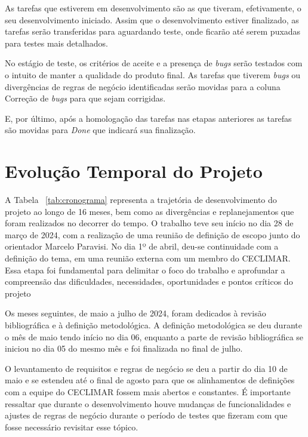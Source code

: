 As tarefas que estiverem em desenvolvimento são as que tiveram, efetivamente, o seu 
desenvolvimento iniciado. Assim que o desenvolvimento estiver finalizado, as tarefas 
serão transferidas para aguardando teste, onde ficarão até serem puxadas para testes 
mais detalhados.

No estágio de teste, os critérios de aceite e a presença de \textit{bugs} serão 
testados com o intuito de manter a qualidade do produto final. As tarefas que tiverem 
\textit{bugs} ou divergências de regras de negócio identificadas serão movidas para a coluna 
Correção de \textit{bugs} para que sejam corrigidas.

E, por último, após a homologação das tarefas nas etapas anteriores as tarefas 
são movidas para \textit{Done} que indicará sua finalização.

\section{Evolução Temporal do Projeto}\label{cronograma}
A Tabela ~\ref{tab:cronograma} representa a trajetória de 
desenvolvimento do projeto ao longo de 16 meses, bem como as divergências e 
replanejamentos que foram realizados no decorrer do tempo. O trabalho teve seu 
início no dia 28 de março de 2024, com a realização de uma reunião de definição 
de escopo junto do orientador Marcelo Paravisi. No dia 1º de abril, deu-se 
continuidade com a definição do tema, em uma reunião externa com um membro do 
CECLIMAR. Essa etapa foi fundamental para delimitar o foco do trabalho e aprofundar 
a compreensão das dificuldades, necessidades, oportunidades e pontos críticos do projeto

Os meses seguintes, de maio a julho de 2024, foram dedicados à revisão bibliográfica 
e à definição metodológica. A definição metodológica se deu durante o mês de maio 
tendo início no dia 06, enquanto a parte de revisão bibliográfica se iniciou no 
dia 05 do mesmo mês e foi finalizada no final de julho. 

O levantamento de requisitos e regras de negócio se deu a partir do dia 10 de 
maio e se estendeu até o final de agosto para que os alinhamentos de definições 
com a equipe do CECLIMAR fossem mais abertos e constantes. É importante ressaltar 
que durante o desenvolvimento houve mudanças de funcionalidades e ajustes de regras 
de negócio durante o período de testes que fizeram com que fosse necessário 
revisitar esse tópico. 

